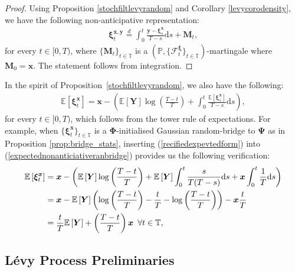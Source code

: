 \documentclass{article}
\newcommand{\levy}{{L\'evy }}
\def\P{\mathbb{P}}
\def\E{\mathbb{E}}
\def\T{\mathbb{T}}
\def\dd{\mathrm{d}}
\def\xib{\boldsymbol{\xi}}
\theoremstyle{definition}
\begin{document}
\begin{proof}
Using Proposition \ref{stochfiltlevyrandom} and Corollary \ref{levycorodensity}, we have the following non-anticipative representation:
\begin{align}
\label{nonanticipativeclassicbridge}
\xib^{\boldsymbol{x},\boldsymbol{y}}_t \overset{d}{=} \int_0^t \frac{  \boldsymbol{y} - \xib^{\boldsymbol{x}}_s }{T-s}\dd s + \mathbf{M}_t,
\end{align}
for every $t\in[0,T)$, where $\{\mathbf{M}_t\}_{t\in\T}$ is a $(\P,\{\mathcal{F}_{t}^{\xib}\}_{t\in\T})$-martingale where $\mathbf{M}_{0} = \boldsymbol{x}$. The statement follows from integration.
\end{proof}
In the spirit of Proposition~\ref{stochfiltlevyrandom}, we also have the following:
\begin{align}
\label{expectednonanticiativeranbridge}
\E\left[\xib^{\boldsymbol{x}}_t\right] = \boldsymbol{x} -\left(\E\left[\boldsymbol{Y}\right]\log\left(\frac{T-t}{T}\right) + \int_0^t \frac{\E\left[\xib^{\boldsymbol{x}}_s\right] }{T-s}\dd s\right),
\end{align}
for every $t\in[0,T)$, which follows from the tower rule of expectations. For example, when $\{\boldsymbol{\xi}^{\boldsymbol{x}}_t\}_{t \in \mathbb{T}}$ is a $\boldsymbol{\Phi}$-initialised Gaussian random-bridge to $\boldsymbol{\Psi}$ as in Proposition \ref{prop:bridge_stats}, inserting (\ref{recifiedexpevtedform}) into (\ref{expectednonanticiativeranbridge}) provides us the following verification:
\begin{align}
\label{expectedbrowniancase}
\E\left[\xib^{\boldsymbol{x}}_t\right] &= \boldsymbol{x} - \left(\E\left[\boldsymbol{Y}\right]\log\left(\frac{T-t}{T}\right) + \E\left[\boldsymbol{Y}\right]\int_0^t \frac{s }{T(T-s)}\dd s + \boldsymbol{x}\int_0^t \frac{1}{T}\dd s \right) \notag \\
&= \boldsymbol{x} - \E\left[\boldsymbol{Y}\right]\left(\log\left(\frac{T-t}{T}\right) - \frac{t}{T} - \log\left(\frac{T-t}{T}\right) \right) - \boldsymbol{x}\frac{t}{T} \notag \\
&= \frac{t}{T}\E\left[\boldsymbol{Y}\right] + \left(\frac{T-t}{T}\right)\boldsymbol{x} \,\,\, \forall t\in\T,\notag
\end{align}

\subsection{\levy Process Preliminaries}\label{app:levy-preliminaries}
\end{document}
